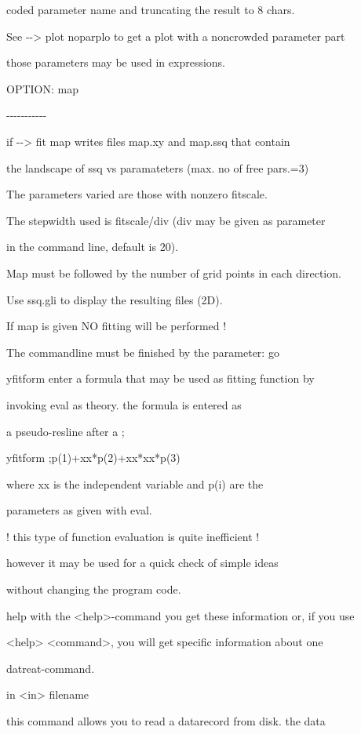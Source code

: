 \documentclass[]{article}
\begin{document}
coded parameter name and truncating the result to 8 chars.

See -\/-\textgreater{} plot noparplo to get a plot with a noncrowded
parameter part

those parameters may be used in expressions.

OPTION: map

-\/-\/-\/-\/-\/-\/-\/-\/-\/-\/-

if -\/-\textgreater{} fit map writes files map.xy and map.ssq that
contain

the landscape of ssq vs paramateters (max. no of free pars.=3)

The parameters varied are those with nonzero fitscale.

The stepwidth used is fitscale/div (div may be given as parameter

in the command line, default is 20).

Map must be followed by the number of grid points in each direction.

Use ssq.gli to display the resulting files (2D).

If map is given NO fitting will be performed !

The commandline must be finished by the parameter: go

yfitform enter a formula that may be used as fitting function by

invoking eval as theory. the formula is entered as

a pseudo-resline after a ;

yfitform ;p(1)+xx*p(2)+xx*xx*p(3)

where xx is the independent variable and p(i) are the

parameters as given with eval.

! this type of function evaluation is quite inefficient !

however it may be used for a quick check of simple ideas

without changing the program code.

help with the \textless{}help\textgreater{}-command you get these
information or, if you use

\textless{}help\textgreater{} \textless{}command\textgreater{}, you will
get specific information about one

datreat-command.

in \textless{}in\textgreater{} filename

this command allows you to read a datarecord from disk. the data
\end{document}
